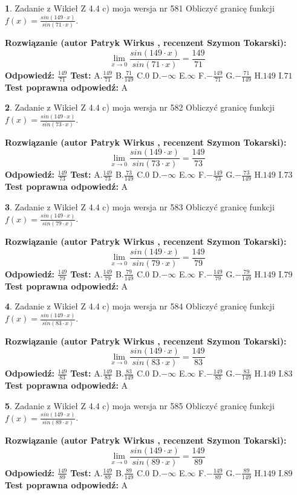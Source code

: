 \documentclass[12pt, a4paper]{article}
\theoremstyle{definition} %
\newtheorem{zad}{}
\newcommand{\zadStart}[1]{\begin{zad}#1\newline}
\newcommand{\zadStop}{\end{zad}}
\newcommand{\rozwStart}[2]{\noindent \textbf{Rozwiązanie (autor #1 , recenzent #2): }\newline}
\newcommand{\rozwStop}{\newline}
\newcommand{\odpStart}{\noindent \textbf{Odpowiedź:}\newline}
\newcommand{\odpStop}{\newline}
\newcommand{\testStart}{\noindent \textbf{Test:}\newline}
\newcommand{\testStop}{\newline}
\newcommand{\kluczStart}{\noindent \textbf{Test poprawna odpowiedź:}\newline}
\newcommand{\kluczStop}{\newline}
\begin{document}
\zadStart{Zadanie z Wikieł Z 4.4 c) moja wersja nr 581}
Obliczyć granicę funkcji $f(x)=\frac{sin(149\cdot x)}{sin(71\cdot x)}$.
\zadStop
\rozwStart{Patryk Wirkus}{Szymon Tokarski}
$$\lim\limits_{x\to 0}\frac{sin(149\cdot x)}{sin(71\cdot x)}=
\frac{149}{71}$$
\rozwStop
\odpStart
$\frac{149}{71}$
\odpStop
\testStart
A.$\frac{149}{71}$
B.$\frac{71}{149}$
C.$0$
D.$-\infty$
E.$\infty$
F.$-\frac{149}{71}$
G.$-\frac{71}{149}$
H.$149$
I.$71$
\testStop
\kluczStart
A
\kluczStop



\zadStart{Zadanie z Wikieł Z 4.4 c) moja wersja nr 582}
Obliczyć granicę funkcji $f(x)=\frac{sin(149\cdot x)}{sin(73\cdot x)}$.
\zadStop
\rozwStart{Patryk Wirkus}{Szymon Tokarski}
$$\lim\limits_{x\to 0}\frac{sin(149\cdot x)}{sin(73\cdot x)}=
\frac{149}{73}$$
\rozwStop
\odpStart
$\frac{149}{73}$
\odpStop
\testStart
A.$\frac{149}{73}$
B.$\frac{73}{149}$
C.$0$
D.$-\infty$
E.$\infty$
F.$-\frac{149}{73}$
G.$-\frac{73}{149}$
H.$149$
I.$73$
\testStop
\kluczStart
A
\kluczStop



\zadStart{Zadanie z Wikieł Z 4.4 c) moja wersja nr 583}
Obliczyć granicę funkcji $f(x)=\frac{sin(149\cdot x)}{sin(79\cdot x)}$.
\zadStop
\rozwStart{Patryk Wirkus}{Szymon Tokarski}
$$\lim\limits_{x\to 0}\frac{sin(149\cdot x)}{sin(79\cdot x)}=
\frac{149}{79}$$
\rozwStop
\odpStart
$\frac{149}{79}$
\odpStop
\testStart
A.$\frac{149}{79}$
B.$\frac{79}{149}$
C.$0$
D.$-\infty$
E.$\infty$
F.$-\frac{149}{79}$
G.$-\frac{79}{149}$
H.$149$
I.$79$
\testStop
\kluczStart
A
\kluczStop



\zadStart{Zadanie z Wikieł Z 4.4 c) moja wersja nr 584}
Obliczyć granicę funkcji $f(x)=\frac{sin(149\cdot x)}{sin(83\cdot x)}$.
\zadStop
\rozwStart{Patryk Wirkus}{Szymon Tokarski}
$$\lim\limits_{x\to 0}\frac{sin(149\cdot x)}{sin(83\cdot x)}=
\frac{149}{83}$$
\rozwStop
\odpStart
$\frac{149}{83}$
\odpStop
\testStart
A.$\frac{149}{83}$
B.$\frac{83}{149}$
C.$0$
D.$-\infty$
E.$\infty$
F.$-\frac{149}{83}$
G.$-\frac{83}{149}$
H.$149$
I.$83$
\testStop
\kluczStart
A
\kluczStop



\zadStart{Zadanie z Wikieł Z 4.4 c) moja wersja nr 585}
Obliczyć granicę funkcji $f(x)=\frac{sin(149\cdot x)}{sin(89\cdot x)}$.
\zadStop
\rozwStart{Patryk Wirkus}{Szymon Tokarski}
$$\lim\limits_{x\to 0}\frac{sin(149\cdot x)}{sin(89\cdot x)}=
\frac{149}{89}$$
\rozwStop
\odpStart
$\frac{149}{89}$
\odpStop
\testStart
A.$\frac{149}{89}$
B.$\frac{89}{149}$
C.$0$
D.$-\infty$
E.$\infty$
F.$-\frac{149}{89}$
G.$-\frac{89}{149}$
H.$149$
I.$89$
\testStop
\kluczStart
A
\kluczStop
\end{document}
